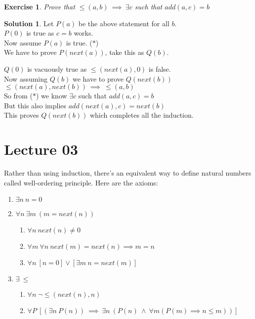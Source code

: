 \documentclass[a4paper,10pt]{article}
\newtheorem{exercise}{Exercise}[section]
\theoremstyle{definition} %
\newtheorem*{solution}{Solution}
\begin{document}
    \newpage
    \begin{exercise}
        Prove that $\leq(a,b) \ \implies \ \exists c$ such that $add(a,c) = b$
    \end{exercise}
    \begin{solution}
        Let $P(a)$ be the above statement for all $b$. \\
        $P(0)$ is true as $c = b$ works. \\ 
        Now assume $P(a)$ is true. \quad ($\ast$) \\
        We have to prove $P(next(a))$, take this as $Q(b)$.
        \begin{adjustwidth}{1cm}{0cm}
            $Q(0)$ is vacuously true as $\leq(next(a), 0)$ is false. \\
            Now assuming $Q(b)$ we have to prove $Q(next(b))$ \\
            $\leq(next(a), next(b)) \ \implies \ \leq(a,b)$ \\
            So from ($\ast$) we know $\exists c$ such that $add(a,c) = b$ \\
            But this also implies $add(next(a), c) = next(b)$ \\
            This proves $Q(next(b))$ which completes all the induction.
        \end{adjustwidth}
    \end{solution}

    \section{Lecture 03}
    Rather than using induction, there's an equivalent way to define natural numbers called
    well-ordering principle. Here are the axioms:

    \begin{tcolorbox}[colback=blue!10!white, colframe=blue!50!black]
        \begin{enumerate}
            \item $\exists n \ n = 0$
            \item $\forall n \ \exists m \ (m = next(n))$
            \begin{enumerate}
                \item $\forall n \ next(n) \neq 0$
                \item $\forall m \ \forall n \ next(m) = next(n) \implies m = n$
                \item $\forall n \ [n = 0] \lor [\exists m \ n = next(m)]$
            \end{enumerate}
            \item $\exists \ \leq$
            \begin{enumerate}
                \item $\forall n \ \lnot \leq(next(n), n)$
                \item $\forall P \ [(\exists n \ P(n)) \ \implies \ \exists n \ (P(n) \ \land \ \forall m(P(m) \implies n \leq m))]$
            \end{enumerate}
        \end{enumerate}
    \end{tcolorbox}
\end{document}
